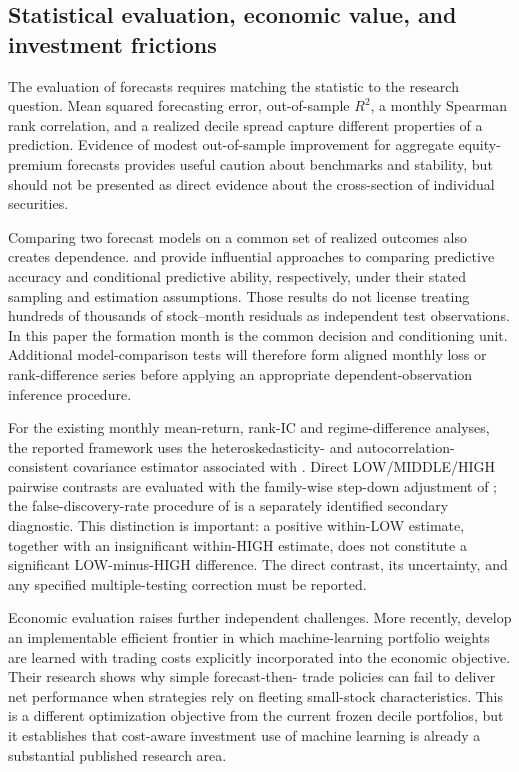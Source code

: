 \subsection{Statistical evaluation, economic value, and investment frictions}
\label{subsec:literature-evaluation}

The evaluation of forecasts requires matching the statistic to the
research question. Mean squared forecasting error, out-of-sample
$R^2$, a monthly Spearman rank correlation, and a realized decile spread
capture different properties of a prediction. Evidence of modest
out-of-sample improvement for aggregate equity-premium forecasts
\citep{CampbellThompson2008,WelchGoyal2008,RapachStraussZhou2010}
provides useful caution about benchmarks and stability, but should not
be presented as direct evidence about the cross-section of individual
securities.

Comparing two forecast models on a common set of realized outcomes
also creates dependence. \cite{DieboldMariano1995} and
\cite{GiacominiWhite2006} provide influential approaches to comparing
predictive accuracy and conditional predictive ability, respectively,
under their stated sampling and estimation assumptions. Those results do
not license treating hundreds of thousands of stock--month residuals
as independent test observations. In this paper the formation month is
the common decision and conditioning unit. Additional model-comparison
tests will therefore form aligned monthly loss or rank-difference series
before applying an appropriate dependent-observation inference procedure.

For the existing monthly mean-return, rank-IC and regime-difference analyses,
the reported framework uses the heteroskedasticity- and
autocorrelation-consistent covariance estimator associated with
\cite{NeweyWest1987}. Direct LOW/MIDDLE/HIGH pairwise contrasts
are evaluated with the family-wise step-down adjustment of
\cite{Holm1979}; the false-discovery-rate procedure of
\cite{BenjaminiHochberg1995} is a separately identified secondary
diagnostic. This distinction is important: a positive within-LOW estimate,
together with an insignificant within-HIGH estimate, does not constitute
a significant LOW-minus-HIGH difference. The direct contrast, its uncertainty,
and any specified multiple-testing correction must be reported.

Economic evaluation raises further independent challenges.
More recently, \cite{JensenKellyMalamudPedersen2026} develop an
implementable efficient frontier in which machine-learning portfolio
weights are learned with trading costs explicitly incorporated into
the economic objective. Their research shows why simple forecast-then-
trade policies can fail to deliver net performance when strategies
rely on fleeting small-stock characteristics. This is a different
optimization objective from the current frozen decile portfolios,
but it establishes that cost-aware investment use of machine learning
is already a substantial published research area.


